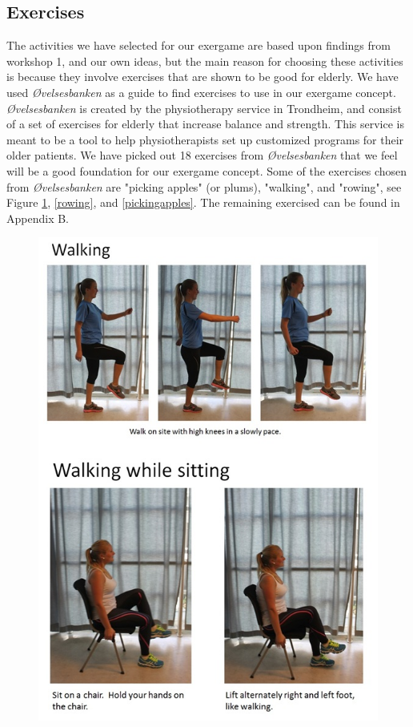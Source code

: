 \subsection{Exercises}
The activities we have selected for our exergame are based upon findings from workshop 1, and our own ideas, but the main reason for choosing these activities is because they involve exercises that are shown to be good for elderly. We have used \emph{Øvelsesbanken} \cite{eldretrening} as a guide to find exercises to use in our exergame concept. \emph{Øvelsesbanken} is created by the physiotherapy service in Trondheim, and consist of a set of exercises for elderly that increase balance and strength. This service is meant to be a tool to help physiotherapists set up customized programs for their older patients. We have picked out 18 exercises from \emph{Øvelsesbanken} that we feel will be a good foundation for our exergame concept. Some of the exercises chosen from \emph{Øvelsesbanken} are "picking apples" (or plums), "walking", and "rowing", see Figure \ref{walking}, \ref{rowing}, and \ref{pickingapples}. The remaining exercised can be found in Appendix B.        

\begin{figure} [H]
\centering
\includegraphics[scale=0.7]{Walking.jpg}
\caption[Exercise - walking]{}
\label{walking}
\end{figure} 

